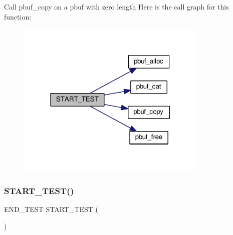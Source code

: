 Call pbuf\+\_\+copy on a pbuf with zero length Here is the call graph for this function\+:
\nopagebreak
\begin{figure}[H]
\begin{center}
\leavevmode
\includegraphics[width=258pt]{openmote-cc2538_2lwip_2test_2unit_2core_2test__pbuf_8c_a3176e3e538ea354100abdb86e48e9eb3_cgraph}
\end{center}
\end{figure}
\mbox{\label{openmote-cc2538_2lwip_2test_2unit_2core_2test__pbuf_8c_ac49c6e9cbd62432654f23b2b6387f61e}} 
\subsubsection{\texorpdfstring{S\+T\+A\+R\+T\+\_\+\+T\+E\+S\+T()}{START\_TEST()}\hspace{0.1cm}{\footnotesize\ttfamily [2/5]}}
{\footnotesize\ttfamily E\+N\+D\+\_\+\+T\+E\+ST S\+T\+A\+R\+T\+\_\+\+T\+E\+ST (\begin{DoxyParamCaption}\item[{test\+\_\+pbuf\+\_\+split\+\_\+64k\+\_\+on\+\_\+small\+\_\+pbufs}]{ }\end{DoxyParamCaption})}

